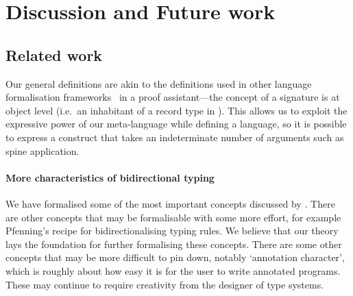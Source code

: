 
\section{Discussion and Future work} \label{sec:future}

\subsection{Related work}
\citet{Harper1993a,Harper2007}

Our general definitions are akin to the definitions used in other language formalisation frameworks~\citep{Ahrens2022,Allais2021,Fiore2022} in a proof assistant---the concept of a signature is at object level (i.e.\ an inhabitant of a record type in \Agda).
This allows us to exploit the expressive power of our meta-language while defining a language, so it is possible to express a construct that takes an indeterminate number of arguments such as spine application.

%
\paragraph{More characteristics of bidirectional typing}

We have formalised some of the most important concepts discussed by \citet{Dunfield2021}.
There are other concepts that may be formalisable with some more effort, for example Pfenning's recipe for bidirectionalising typing rules.
We believe that our theory lays the foundation for further formalising these concepts.
There are some other concepts that may be more difficult to pin down, notably `annotation character', which is roughly about how easy it is for the user to write annotated programs.
These may continue to require creativity from the designer of type systems.

